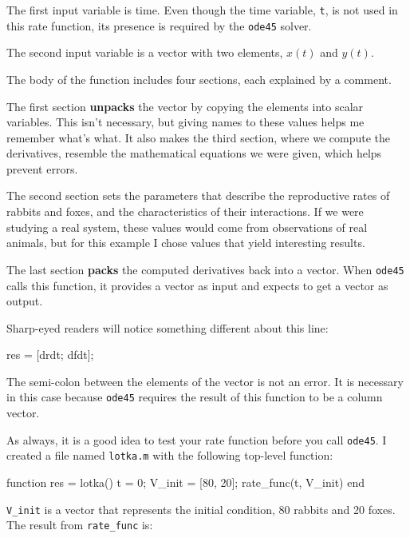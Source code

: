 The first input variable is time.
Even though the time variable, {\tt t}, is not used in this rate function, its presence is required by the {\tt ode45} solver.

The second input variable is a vector with two elements,
$x(t)$ and $y(t)$.

The body of the function includes four sections,
each explained by a comment.

The first section {\bf unpacks} the vector by copying the elements
into scalar variables.  This isn't necessary, but giving names to
these values helps me remember what's what.  It also makes the third
section, where we compute the derivatives, resemble the mathematical
equations we were given, which helps prevent errors.


The second section sets the parameters that describe the
reproductive rates of rabbits and foxes, and the characteristics of
their interactions.  If we were studying a real system, these values
would come from observations of real animals, but for this example
I chose values that yield interesting results.


The last section {\bf packs} the computed derivatives back into a
vector.  When {\tt ode45} calls this function, it provides a vector
as input and expects to get a vector as output.

Sharp-eyed readers will notice something different about this line:

\begin{code}
    res = [drdt; dfdt];
\end{code}

The semi-colon between the elements of the vector is not an error.  It
is necessary in this case because {\tt ode45} requires the result of
this function to be a column vector.


As always, it is a good idea to test your rate function before you call {\tt ode45}.  I created a file named {\tt lotka.m} with the following top-level function:

\begin{code}
function res = lotka()
    t = 0;
    V_init = [80, 20];
    rate_func(t, V_init)
end
\end{code}


\verb"V_init" is a vector that represents the initial condition, 80 rabbits and 20 foxes.  The result from \verb"rate_func" is:

